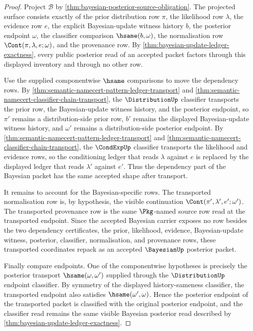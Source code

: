 \begin{proof}
Project $\mathcal{B}$ by \autoref{thm:bayesian-posterior-source-obligation}.
The projected surface consists exactly of the prior distribution row $\pi$, the
likelihood row $\lambda$, the evidence row $e$, the explicit Bayesian-update
witness history $b$, the posterior endpoint $\omega$, the classifier comparison
$\hsame(b,\omega)$, the normalisation row $\Cont(\pi,\lambda,e;\omega)$, and
the provenance row. By \autoref{thm:bayesian-update-ledger-exactness}, every
public posterior read of an accepted packet factors through this displayed
inventory and through no other row.

Use the supplied componentwise $\hsame$ comparisons to move the dependency
rows. By \autoref{thm:semantic-namecert-pattern-ledger-transport} and
\autoref{thm:semantic-namecert-classifier-chain-transport}, the
$\DistributionUp$ classifier transports the prior row, the Bayesian-update
witness history, and the posterior endpoint, so $\pi'$ remains a
distribution-side prior row, $b'$ remains the displayed Bayesian-update witness
history, and $\omega'$ remains a distribution-side posterior endpoint. By
\autoref{thm:semantic-namecert-pattern-ledger-transport} and
\autoref{thm:semantic-namecert-classifier-chain-transport}, the $\CondExpUp$
classifier transports the likelihood and evidence rows, so the conditioning
ledger that reads $\lambda$ against $e$ is replaced by the displayed ledger that
reads $\lambda'$ against $e'$. Thus the dependency part of the Bayesian packet
has the same accepted shape after transport.

It remains to account for the Bayesian-specific rows. The transported
normalisation row is, by hypothesis, the visible continuation
$\Cont(\pi',\lambda',e';\omega')$. The transported provenance row is the same
$\Pkg$-named source row read at the transported endpoint. Since the accepted
Bayesian carrier exposes no row besides the two dependency certificates, the
prior, likelihood, evidence, Bayesian-update witness, posterior, classifier,
normalisation, and provenance rows, these transported coordinates repack as an
accepted $\BayesianUp$ posterior packet.

Finally compare endpoints. One of the componentwise hypotheses is precisely
the posterior transport $\hsame(\omega,\omega')$ supplied through the
$\DistributionUp$ endpoint classifier. By symmetry of the displayed
history-sameness classifier, the transported endpoint also satisfies
$\hsame(\omega',\omega)$. Hence the posterior endpoint of the transported
packet is classified with the original posterior endpoint, and the classifier
read remains the same visible Bayesian posterior read described by
\autoref{thm:bayesian-update-ledger-exactness}.
\end{proof}

